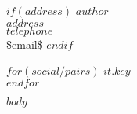 \documentclass[
$if(fontsize)$
  $fontsize$,
$endif$
$if(papersize)$
  $papersize$paper,
$endif$
$if(aspectratio)$
  aspectratio=$aspectratio$,
$endif$
$for(classoption)$
  $classoption$$sep$,
$endfor$
]{scrartcl}
\begin{document}
$if(address)$
$author$\\
$address$\\
$telephone$\\
\url{$email$}
$endif$

$for(social/pairs)$
  \href{$it.value$}{$it.key$}\\
$endfor$

\begin{abstract}
\noindent
$abstract$
\end{abstract}

$body$
\end{document}
